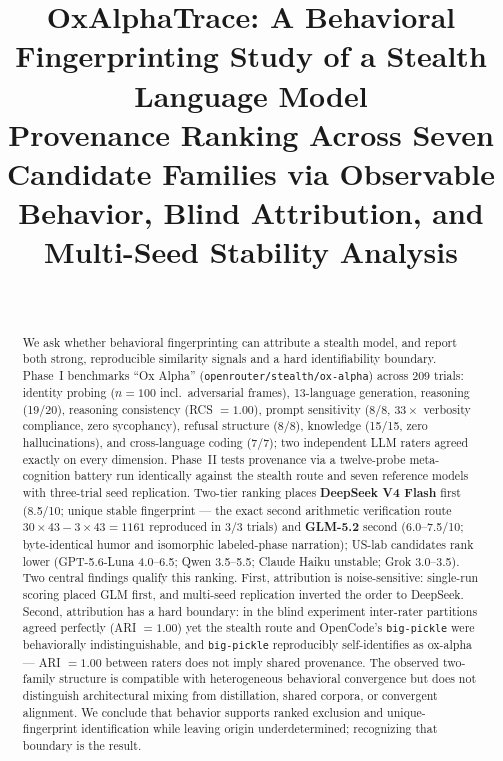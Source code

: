 \documentclass[conference]{IEEEtran}
\begin{document}
\title{OxAlphaTrace: A Behavioral Fingerprinting Study of a Stealth Language Model\\
{\large Provenance Ranking Across Seven Candidate Families via Observable Behavior, Blind Attribution, and Multi-Seed Stability Analysis}}

\author{\\
}

\maketitle

\begin{abstract}
We ask whether behavioral fingerprinting can attribute a stealth model, and report both strong, reproducible similarity signals and a hard identifiability boundary. Phase~I benchmarks ``Ox Alpha'' (\texttt{openrouter/stealth/ox-alpha}) across 209 trials: identity probing ($n{=}100$ incl.\ adversarial frames), 13-language generation, reasoning (19/20), reasoning consistency (RCS $=1.00$), prompt sensitivity (8/8, $33\times$ verbosity compliance, zero sycophancy), refusal structure (8/8), knowledge (15/15, zero hallucinations), and cross-language coding (7/7); two independent LLM raters agreed exactly on every dimension. Phase~II tests provenance via a twelve-probe meta-cognition battery run identically against the stealth route and seven reference models with three-trial seed replication. Two-tier ranking places \textbf{DeepSeek V4 Flash} first (8.5/10; unique stable fingerprint --- the exact second arithmetic verification route $30{\times}43{-}3{\times}43=1161$ reproduced in 3/3 trials) and \textbf{GLM-5.2} second (6.0--7.5/10; byte-identical humor and isomorphic labeled-phase narration); US-lab candidates rank lower (GPT-5.6-Luna 4.0--6.5; Qwen 3.5--5.5; Claude Haiku unstable; Grok 3.0--3.5). Two central findings qualify this ranking. First, attribution is noise-sensitive: single-run scoring placed GLM first, and multi-seed replication inverted the order to DeepSeek. Second, attribution has a hard boundary: in the blind experiment inter-rater partitions agreed perfectly (ARI $=1.00$) yet the stealth route and OpenCode's \texttt{big-pickle} were behaviorally indistinguishable, and \texttt{big-pickle} reproducibly self-identifies as ox-alpha --- ARI $=1.00$ between raters does not imply shared provenance. The observed two-family structure is compatible with heterogeneous behavioral convergence but does not distinguish architectural mixing from distillation, shared corpora, or convergent alignment. We conclude that behavior supports ranked exclusion and unique-fingerprint identification while leaving origin underdetermined; recognizing that boundary is the result.
\end{abstract}
\end{document}
